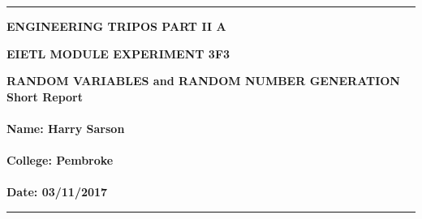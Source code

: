 \documentclass[12pt]{article}
\begin{document}
\noindent
\rule{15.7cm}{0.5mm}


\begin{center}
{\bf ENGINEERING TRIPOS PART II A}
\end{center}
\vspace{0.5cm} {\bf EIETL \hfill MODULE EXPERIMENT 3F3}
\vspace{0.5cm}
\begin{center}
{\bf RANDOM VARIABLES and RANDOM NUMBER GENERATION\\
Short  Report \\\hfill \\Name: Harry Sarson \\\hfill\\
College: Pembroke \\\hfill
\\
Date: 03/11/2017
}
\end{center}
\rule{15.7cm}{0.5mm}

\pagebreak
\end{document}
